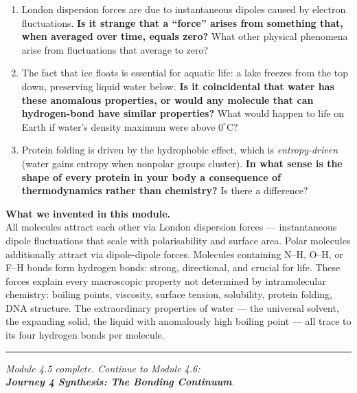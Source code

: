 \documentclass[12pt, a4paper]{book}
\begin{document}
\begin{reflectionbox}
\begin{enumerate}[label=\textbf{R\arabic*.}]
  \item London dispersion forces are due to instantaneous
    dipoles caused by electron fluctuations.
    \textbf{Is it strange that a ``force'' arises from
    something that, when averaged over time, equals zero?}
    What other physical phenomena arise from fluctuations
    that average to zero?

  \item The fact that ice floats is essential for aquatic life:
    a lake freezes from the top down, preserving liquid water
    below.
    \textbf{Is it coincidental that water has these anomalous
    properties, or would any molecule that can hydrogen-bond
    have similar properties?}
    What would happen to life on Earth if water's density
    maximum were above $0^\circ$C?

  \item Protein folding is driven by the hydrophobic effect,
    which is \emph{entropy-driven} (water gains entropy when
    nonpolar groups cluster).
    \textbf{In what sense is the shape of every protein in
    your body a consequence of thermodynamics rather than
    chemistry?}
    Is there a difference?
\end{enumerate}
\end{reflectionbox}

\vspace{1.5em}
\begin{center}
\begin{tcolorbox}[enhanced, colback=DiscoveryColor!8, colframe=DiscoveryColor,
  width=0.88\textwidth, arc=3pt]
\centering\sffamily\small
\textbf{What we invented in this module.}\\[4pt]
All molecules attract each other via London dispersion forces
--- instantaneous dipole fluctuations that scale with
polarisability and surface area.
Polar molecules additionally attract via dipole-dipole forces.
Molecules containing N--H, O--H, or F--H bonds form
hydrogen bonds: strong, directional, and crucial for life.
These forces explain every macroscopic property not
determined by intramolecular chemistry: boiling points,
viscosity, surface tension, solubility, protein folding, DNA structure.
The extraordinary properties of water --- the universal solvent,
the expanding solid, the liquid with anomalously high boiling
point --- all trace to its four hydrogen bonds per molecule.
\end{tcolorbox}
\end{center}

\vspace{2em}
\noindent\textcolor{JourneyColor!40}{\rule{\textwidth}{0.6pt}}
\begin{center}\textit{\sffamily\small
Module 4.5 complete. Continue to Module 4.6:\\
\textbf{Journey 4 Synthesis: The Bonding Continuum}.}
\end{center}
\end{document}
